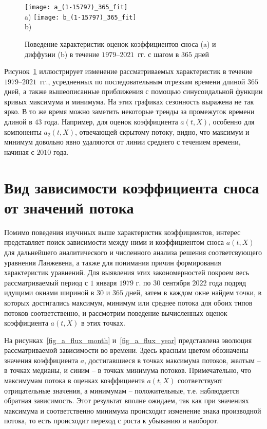 \begin{figure}[h!]
	\centering
	\texttt{[image: a\_(1-15797)\_365\_fit]}\\
	a)
	\texttt{[image: b\_(1-15797)\_365\_fit]}\\
	b)
	\caption{Поведение характеристик оценок коэффициентов сноса (a) и диффузии (b) в течение $1979$--$2021$~гг. с шагом в $365$ дней}
	\label{fig_ab_year}
\end{figure}

Рисунок~\ref{fig_ab_year} иллюстрирует изменение рассматриваемых характеристик в течение $1979$--$2021$~гг., усредненных по последовательным отрезкам времени длиной $365$ дней, а также вышеописанные приближения с помощью синусоидальной функции кривых максимума и минимума. На этих графиках сезонность выражена не так ярко. В то же время можно заметить некоторые тренды за промежуток времени длиной в $43$ года. Например, для оценок коэффициента $a(t,X)$, особенно для компоненты $a_2(t,X)$, отвечающей скрытому потоку, видно, что максимум и минимум довольно явно удаляются от линии среднего с течением времени, начиная с $2010$ года. 

\clearpage

\section{Вид зависимости коэффициента сноса от значений потока}
Помимо поведения изучнных выше характеристик коэффициентов, интерес представляет поиск зависимости между ними и коэффициентом сноса $a(t,X)$ для дальнейшего аналитического и численного анализа решения соответсвующего уравнения Ланжевена,  а также для понимания причин формирования характеристик уравнений. Для выявления этих закономерностей покроем весь рассматриваемый период с $1$ января $1979$ г. по $30$ сентября $2022$ года подряд идущими окнами шириной в $30$ и $365$ дней, затем в каждом окне найдем точки, в которых достигались максимум, минимум или среднее потока для обоих типов потоков соответственно, и рассмотрим поведение вычисленных оценок коэффициента $a(t,X)$ в этих точках.

На рисунках~\ref{fig_a_flux_month} и~\ref{fig_a_flux_year} представлена эволюция рассматриваемой зависимости во времени. Здесь красным цветом обозначены значения коэффициента $a$, достигавшиеся в точках максимума потоков, желтым -- в точках медианы, и синим -- в точках минимума потоков. Примечательно, что максимумам потока в оценках коэффициента $a(t,X)$ соответствуют отрицательные значения, а минимумам -- положительные, т.е. наблюдается обратная зависимость. Этот результат вполне ожидаем, так как при значениях максимума и соответственно минимума происходит изменение знака производной потока, то есть происходит переход с роста к убыванию и наоборот.

